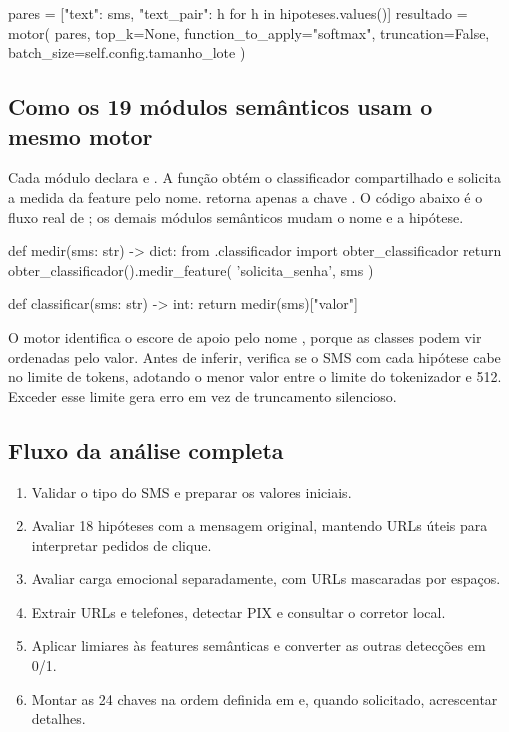 \begin{codigofonte}
pares = [{"text": sms, "text_pair": h}
         for h in hipoteses.values()]
resultado = motor(
    pares, top_k=None, function_to_apply="softmax",
    truncation=False, batch_size=self.config.tamanho_lote
)
\end{codigofonte}

\clearpage
\subsection{Como os 19 módulos semânticos usam o mesmo motor}
Cada módulo declara  e . A função  obtém o classificador compartilhado e solicita a medida da feature pelo nome.  retorna apenas a chave . O código abaixo é o fluxo real de ; os demais módulos semânticos mudam o nome e a hipótese.

\begin{codigofonte}
def medir(sms: str) -> dict:
    from .classificador import obter_classificador
    return obter_classificador().medir_feature(
        'solicita_senha', sms
    )

def classificar(sms: str) -> int:
    return medir(sms)["valor"]
\end{codigofonte}

O motor identifica o escore de apoio pelo nome , porque as classes podem vir ordenadas pelo valor. Antes de inferir, verifica se o SMS com cada hipótese cabe no limite de tokens, adotando o menor valor entre o limite do tokenizador e 512. Exceder esse limite gera erro em vez de truncamento silencioso.

\subsection{Fluxo da análise completa}
\begin{enumerate}
\item Validar o tipo do SMS e preparar os valores iniciais.
\item Avaliar 18 hipóteses com a mensagem original, mantendo URLs úteis para interpretar pedidos de clique.
\item Avaliar carga emocional separadamente, com URLs mascaradas por espaços.
\item Extrair URLs e telefones, detectar PIX e consultar o corretor local.
\item Aplicar limiares às features semânticas e converter as outras detecções em 0/1.
\item Montar as 24 chaves na ordem definida em  e, quando solicitado, acrescentar detalhes.
\end{enumerate}

